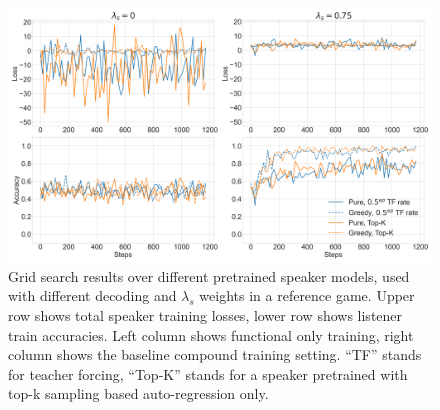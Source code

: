 \begin{figure}[h]
	\centering
	\includegraphics[width=\linewidth]{images/grid_search_pretraining_Ls_decoding.png}
	\caption{Grid search results over different pretrained speaker models, used with different decoding and $\lambda_s$ weights in a reference game. Upper row shows total speaker training losses, lower row shows listener train accuracies. Left column shows functional only training, right column shows the baseline compound training setting. ``TF'' stands for teacher forcing, ``Top-K'' stands for a speaker pretrained with top-k sampling based auto-regression only.}
	\label{fig:coco_grid_pretraining_decoding}
\end{figure}

